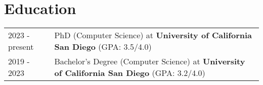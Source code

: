\section{Education}
\begin{tabularx}{\linewidth}{@{}l X@{}}
	2023 - present & PhD (Computer Science) at \textbf{University of California San Diego} \hfill (GPA: 3.5/4.0)               \\
	2019 - 2023    & Bachelor's Degree (Computer Science) at \textbf{University of California San Diego} \hfill (GPA: 3.2/4.0) \\
\end{tabularx}

